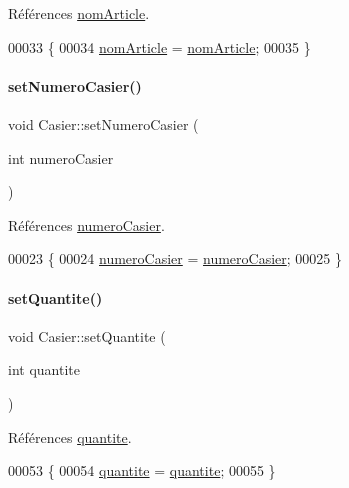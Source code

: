 Références \hyperlink{class_casier_a9632bfa0e94a522bab9da1c3834eaf5a}{nom\+Article}.


\begin{DoxyCode}
00033 \{
00034     \hyperlink{class_casier_a9632bfa0e94a522bab9da1c3834eaf5a}{nomArticle} = \hyperlink{class_casier_a9632bfa0e94a522bab9da1c3834eaf5a}{nomArticle};
00035 \}
\end{DoxyCode}
\mbox{\label{class_casier_a5ae4ea249ab63e1ad44af87fb019a6b0}} 
\paragraph{\texorpdfstring{set\+Numero\+Casier()}{setNumeroCasier()}}
{\footnotesize\ttfamily void Casier\+::set\+Numero\+Casier (\begin{DoxyParamCaption}\item[{int}]{numero\+Casier }\end{DoxyParamCaption})}



Références \hyperlink{class_casier_abc4e6c9bde55c9b703ea53d85b6b1219}{numero\+Casier}.


\begin{DoxyCode}
00023 \{
00024     \hyperlink{class_casier_abc4e6c9bde55c9b703ea53d85b6b1219}{numeroCasier} = \hyperlink{class_casier_abc4e6c9bde55c9b703ea53d85b6b1219}{numeroCasier};
00025 \}
\end{DoxyCode}
\mbox{\label{class_casier_a41aee5f476516dc87b66674c6b9c6d4b}} 
\paragraph{\texorpdfstring{set\+Quantite()}{setQuantite()}}
{\footnotesize\ttfamily void Casier\+::set\+Quantite (\begin{DoxyParamCaption}\item[{int}]{quantite }\end{DoxyParamCaption})}



Références \hyperlink{class_casier_acf950b0ab2ee437a9dbc8c6b66432b4c}{quantite}.


\begin{DoxyCode}
00053 \{
00054     \hyperlink{class_casier_acf950b0ab2ee437a9dbc8c6b66432b4c}{quantite} = \hyperlink{class_casier_acf950b0ab2ee437a9dbc8c6b66432b4c}{quantite};
00055 \}
\end{DoxyCode}


